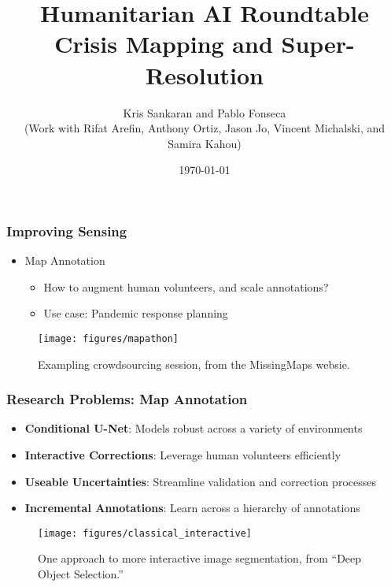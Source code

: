 \documentclass[10pt,mathserif]{beamer}
\title{\large \bfseries Humanitarian AI Roundtable \\ Crisis Mapping and Super-Resolution}
\author{Kris Sankaran and Pablo Fonseca\\ (Work with Rifat Arefin, Anthony
  Ortiz, Jason Jo, Vincent Michalski, and Samira Kahou)}
\date{\today}
\begin{document}
\maketitle



\begin{frame}
  \frametitle{Improving Sensing}
  \begin{itemize}
  \item Map Annotation
    \begin{itemize}
    \item How to augment human volunteers, and scale annotations?
    \item Use case: Pandemic response planning
    \end{itemize}
  \end{itemize}
  \begin{figure}
    \centering
    \texttt{[image: figures/mapathon]}
    \caption{Exampling crowdsourcing session, from the MissingMaps
      websie. \label{fig:label} }
  \end{figure}
\end{frame}

\begin{frame}
  \frametitle{Research Problems: Map Annotation}
  \begin{itemize}
  \item \textbf{Conditional U-Net}: Models robust across a variety of environments
  \item \textbf{Interactive Corrections}: Leverage human volunteers efficiently
  \item \textbf{Useable Uncertainties}: Streamline validation and correction processes
  \item \textbf{Incremental Annotations}: Learn across a hierarchy of annotations
  \end{itemize}  
  \begin{figure}[ht]
    \centering
    \texttt{[image: figures/classical\_interactive]}
    \caption{One approach to more interactive image segmentation, from ``Deep
      Object Selection.'' \label{fig:label} }
  \end{figure}
\end{frame}
\end{document}
